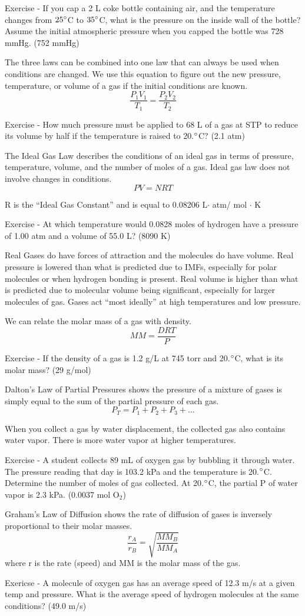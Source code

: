 \documentclass[../hchem.tex]{subfiles}
\begin{document}
Exercise - If you cap a 2 L coke bottle containing air, and the temperature changes from $25\degree$C to $35\degree$C, what is the pressure on the inside wall of the bottle?
Assume the initial atmospheric pressure when you capped the bottle was 728 mmHg. (752 mmHg)

The three laws can be combined into one law that can always be used when conditions are changed. We use this equation to figure out the new 
pressure, temperature, or volume of a gas if the initial conditions are known.
\[\frac{P_1V_1}{T_1}=\frac{P_2V_2}{T_2}\]

Exercise - How much pressure must be applied to 68 L of a gas at STP to reduce its volume by half if the temperature is raised to 20.$\degree$C? (2.1 atm)

The Ideal Gas Law describes the conditions of an ideal gas in terms of pressure, temperature, volume, and the number of moles of a gas.
Ideal gas law does not involve changes in conditions.
\[PV=NRT\]

R is the ``Ideal Gas Constant'' and is equal to 0.08206 L$\cdot$ atm/ mol $\cdot$ K 

Exercise - At which temperature would 0.0828 moles of hydrogen have a pressure of 1.00 atm and a volume of 55.0 L? (8090 K)

Real Gases do have forces of attraction and the molecules do have volume. Real pressure is lowered than what is predicted due to IMFs, especially 
for polar molecules or when hydrogen bonding is present. Real volume is higher than what is predicted due to molecular volume being significant, especially for larger molecules of gas.
Gases act ``most ideally'' at high temperatures and low pressure.

We can relate the molar mass of a gas with density.
\[MM=\frac{DRT}{P}\]

Exercise - If the density of a gas is 1.2 g/L at 745 torr and 20.$\degree$C, what is its molar mass? (29 g/mol)

Dalton's Law of Partial Pressures shows the pressure of a mixture of gases is simply equal to the sum of the partial pressure of each gas.
\[P_T = P_1 + P_2 + P_3 + \dots\]

When you collect a gas by water displacement, the collected gas also contains water vapor. There is more water vapor at higher temperatures.

Exercise - A student collects 89 mL of oxygen gas by bubbling it through water. The pressure reading that day is 103.2 kPa and the temperature is 20.$\degree$C. Determine the number of moles 
of gas collected. At 20.$\degree$C, the partial P of water vapor is 2.3 kPa. (0.0037 mol O$_2$)

Graham's Law of Diffusion shows the rate of diffusion of gases is inversely proportional to their molar masses.
\[\frac{r_A}{r_B}=\sqrt{\frac{MM_B}{MM_A}}\]
where r is the rate (speed) and MM is the molar mass of the gas.

Exericse - A molecule of oxygen gas has an average speed of 12.3 m/s at a given temp and pressure. What is the 
average speed of hydrogen molecules at the same conditions? (49.0 m/s)
\end{document}
